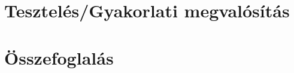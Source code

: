 \documentclass[12pt]{report}
\begin{document}
	\chapter{Tesztelés/Gyakorlati megvalósítás}
	
	
	\chapter{Összefoglalás}
	
	
	\pagebreak
	
	
	
	
\end{document}
